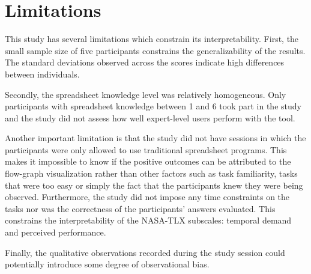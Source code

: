 \section{Limitations}
\label{sec:limitations}
This study has several limitations which constrain its interpretability. First, the small sample size of five participants constrains the generalizability of the results. The standard deviations observed across the scores indicate high differences between individuals. 

Secondly, the spreadsheet knowledge level was relatively homogeneous. Only participants with spreadsheet knowledge between 1 and 6 took part in the study and the study did not assess how well expert-level users perform with the tool. 

Another important limitation is that the study did not have sessions in which the participants were only allowed to use traditional spreadsheet programs. This makes it impossible to know if the positive outcomes can be attributed to the flow-graph visualization rather than other factors such as task familiarity, tasks that were too easy or simply the fact that the participants knew they were being observed.
Furthermore, the study did not impose any time constraints on the tasks nor was the correctness of the participants' answers evaluated. This constrains the interpretability of the NASA-TLX subscales: temporal demand and perceived performance.


Finally, the qualitative observations recorded during the study session could potentially introduce some degree of observational bias.